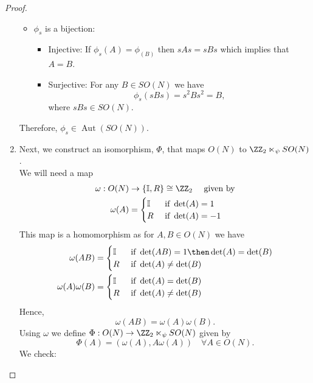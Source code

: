 \documentclass[12pt, a4paper]{article}
\DeclareMathOperator{\aut}{Aut}
\begin{document}
\begin{proof}
\begin{enumerate}
\begin{itemize}
            \item \(\phi_s\) is a bijection:
                \begin{itemize}
                    \item Injective: If \(\phi_s(A)=\phi_(B)\) then \(sAs=sBs\) which implies that \(A=B\).
                    \item Surjective: For any \(B \in SO(N)\) we have 
                    \[\phi_s(sBs)=s^2Bs^2 =B,\]
                    where \(sBs \in SO(N)\).
                \end{itemize}
        \end{itemize}
        Therefore, \(\phi_s \in \aut(SO(N))\).
        \item Next, we construct an isomorphism, \(\Phi\), that maps \(O(N)\) to \(\ZZ_2 \ltimes_{\psi} SO(N)\). \\
        We will need a map 
        \[\begin{aligned}
            \omega: O(N) &\to \{\mathbb{I},R\} \cong \ZZ_2 \quad \text{ given by} \\
            \omega(A) &=\begin{cases}
                \mathbb{I} &\text{ if } \det(A)=1 \\
                R &\text{ if } \det(A)=-1
            \end{cases}
        \end{aligned}\]
        This map is a homomorphism as for \(A,B \in O(N)\) we have 
        \[\begin{aligned}
            \omega(AB) &= \begin{cases}
            \mathbb{I}  &\text{ if } \det(AB)=1 \then \det(A)=\det(B)\\
            R &\text{ if } \det(A) \neq \det(B)
            \end{cases} \\
            \omega(A)\omega(B) &=\begin{cases}
                \mathbb{I} &\text{ if } \det(A)=\det(B) \\
                R &\text{ if } \det(A) \neq \det(B)
            \end{cases} \\
        \end{aligned}\]
        Hence,
        \[\omega(AB)=\omega(A)\omega(B).\]
        Using \(\omega\) we define \(\Phi :O(N) \to \ZZ_2 \ltimes_{\psi} SO(N)\) given by
        \[\Phi(A) =(\omega(A),A\omega(A)) \quad \forall A\in O(N).\]
        We check:
        \begin{itemize}

\end{itemize}
\end{enumerate}
\end{proof}
\end{document}
